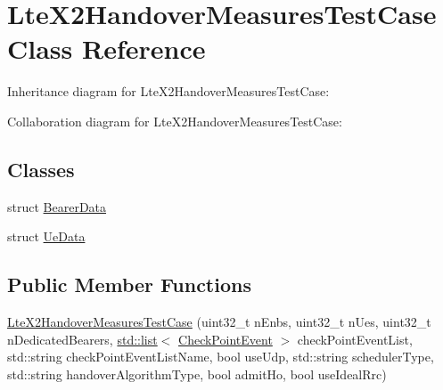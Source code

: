 \hypertarget{classLteX2HandoverMeasuresTestCase}{}\section{Lte\+X2\+Handover\+Measures\+Test\+Case Class Reference}
\label{classLteX2HandoverMeasuresTestCase}


Inheritance diagram for Lte\+X2\+Handover\+Measures\+Test\+Case\+:


Collaboration diagram for Lte\+X2\+Handover\+Measures\+Test\+Case\+:
\subsection*{Classes}
\begin{DoxyCompactItemize}
\item 
struct \hyperlink{structLteX2HandoverMeasuresTestCase_1_1BearerData}{Bearer\+Data}
\item 
struct \hyperlink{structLteX2HandoverMeasuresTestCase_1_1UeData}{Ue\+Data}
\end{DoxyCompactItemize}
\subsection*{Public Member Functions}
\begin{DoxyCompactItemize}
\item 
\hyperlink{classLteX2HandoverMeasuresTestCase_a746b6f1d11732d65616a97aa6267e614}{Lte\+X2\+Handover\+Measures\+Test\+Case} (uint32\+\_\+t n\+Enbs, uint32\+\_\+t n\+Ues, uint32\+\_\+t n\+Dedicated\+Bearers, \hyperlink{openflow-interface_8h_afd9bcfa176617760671b67580f536fa7}{std\+::list}$<$ \hyperlink{structCheckPointEvent}{Check\+Point\+Event} $>$ check\+Point\+Event\+List, std\+::string check\+Point\+Event\+List\+Name, bool use\+Udp, std\+::string scheduler\+Type, std\+::string handover\+Algorithm\+Type, bool admit\+Ho, bool use\+Ideal\+Rrc)
\end{DoxyCompactItemize}
